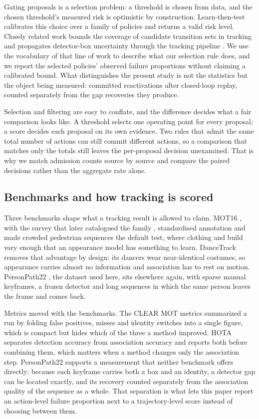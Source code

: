 Gating proposals is a selection problem: a threshold is chosen from data,
and the chosen threshold's measured risk is optimistic by construction.
Learn-then-test \cite{angelopoulos2021learn} calibrates this choice over a
family of policies and returns a valid risk level. Closely related work
bounds the coverage of candidate transition sets in tracking
\cite{li2022pac} and propagates detector-box uncertainty through the
tracking pipeline \cite{su2024motcup}. We use the vocabulary of that line
of work to describe
what our selection rule does, and we report the selected policies'
observed failure proportions without claiming a calibrated bound. What
distinguishes the present study is not the statistics but the object being
measured: committed reactivations after closed-loop replay, counted
separately from the gap recoveries they produce.

Selection and filtering are easy to conflate, and the difference decides
what a fair comparison looks like. A threshold selects one operating point
for every proposal; a score decides each proposal on its own evidence. Two
rules that admit the same total number of actions can still commit
different actions, so a comparison that matches only the totals still
leaves the per-proposal decision unexamined. That is why we match admission
counts source by source and compare the paired decisions rather than the
aggregate rate alone.

\subsection{Benchmarks and how tracking is scored}

Three benchmarks shape what a tracking result is allowed to claim. MOT16
\cite{milan2016mot16}, with the survey that later catalogued the family
\cite{dendorfer2020motchallenge}, standardised annotation and made crowded pedestrian
sequences the default test, where clothing and build vary enough that an
appearance model has something to learn. DanceTrack
\cite{sun2022dancetrack} removes that advantage by design: its dancers wear
near-identical costumes, so appearance carries almost no information and
association has to rest on motion. PersonPath22
\cite{shuai2022personpath22}, the dataset used here, sits elsewhere again,
with sparse manual keyframes, a frozen detector and long sequences in which
the same person leaves the frame and comes back.

Metrics moved with the benchmarks. The CLEAR MOT metrics
\cite{bernardin2008clear} summarized a run by folding false positives,
misses and identity switches into a single figure, which is compact but
hides which of the three a method improved. HOTA \cite{luiten2021hota}
separates
detection accuracy from association accuracy and reports both before
combining them, which matters when a method changes only the association
step. PersonPath22 supports a measurement that neither benchmark offers
directly: because each keyframe carries both a box and an identity, a
detector gap can be located exactly, and its recovery counted separately
from the association quality of the sequence as a whole. That separation is
what lets this paper report an action-level failure proportion next to a
trajectory-level score instead of choosing between them.
